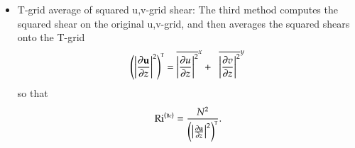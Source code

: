 \begin{itemize}
\item {\sc T-grid average of squared u,v-grid shear}: The third method
  computes the squared shear on the original u,v-grid, and then averages
  the squared shears onto the T-grid
\begin{equation}
  \left( \left| \frac{\partial {\bf u}}{\partial z} \right|^{2} \right)^{\mbox{\tiny T}}
  = \overline{  \left| \frac{\partial u}{\partial z} \right|^{2}   }^{x}
    +
   \; \; \overline{ \left| \frac{\partial v}{\partial z} \right|^{2}  }^{y}
\end{equation}
so that 
\begin{equation}
    \mbox{Ri}^{(\mbox{\tiny Bc})} = \frac{N^{2}} { \left( \left| \frac{\partial {\bf u}}{\partial z} \right|^{2} \right)^{\mbox{\tiny T}}}.
\end{equation}


\end{itemize}

